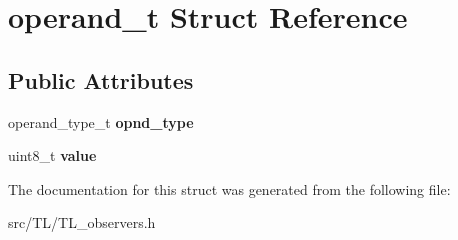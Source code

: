 \hypertarget{structoperand__t}{}\section{operand\+\_\+t Struct Reference}
\label{structoperand__t}
\subsection*{Public Attributes}
\begin{DoxyCompactItemize}
\item 
\mbox{\label{structoperand__t_a81504cb7a2e5de467684f405462e194f}} 
operand\+\_\+type\+\_\+t {\bfseries opnd\+\_\+type}
\item 
\mbox{\label{structoperand__t_acb4d90a5903553a7b9b35336e04ec976}} 
uint8\+\_\+t {\bfseries value}
\end{DoxyCompactItemize}


The documentation for this struct was generated from the following file\+:\begin{DoxyCompactItemize}
\item 
src/\+T\+L/T\+L\+\_\+observers.\+h\end{DoxyCompactItemize}
